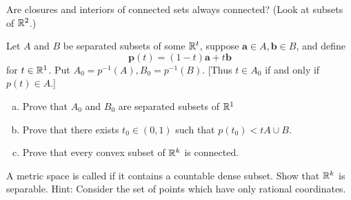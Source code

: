 \begin{myExercise}
    \label{ex:2.20}
    Are closures and interiors of connected sets always connected? 
    (Look at subsets of ${\protect\mathbb R}^2$.)
\end{myExercise}

\begin{myExercise}
    \label{ex:2.21}
    Let $A$ and $B$ be separated subsets of some ${\protect\mathbb R}^t$, 
    suppose $\mathbf{a} \in A, \mathbf{b} \in B$,
    and define 
    \begin{equation*}
        \mathbf{p}(t) = (1 - t)\mathbf{a} + t\mathbf{b}
    \end{equation*}
    for $t \in {\protect\mathbb R}^1$. 
    Put $A_0= p^{-1}(A), B_0= p^{-1}(B)$. 
    [Thus $t \in A_0$ if and only if $p(t) \in A$.]
    \begin{enumerate}[(a)]
        \item Prove that $A_0$ and $B_0$ are separated subsets of ${\protect\mathbb R}^1$
        \item Prove that there exists $t_0 \in (0, 1)$ such that $p(t_0) <t A \cup B$.
        \item Prove that every convex subset of ${\protect\mathbb R}^k$ is connected.
    \end{enumerate}
\end{myExercise}

\begin{myExercise}
    \label{ex:2.22}
    A metric space is called  if it contains a countable dense subset. 
    Show that ${\protect\mathbb R}^k$ is separable. 
    Hint: Consider the set of points which have only rational coordinates.
\end{myExercise}
